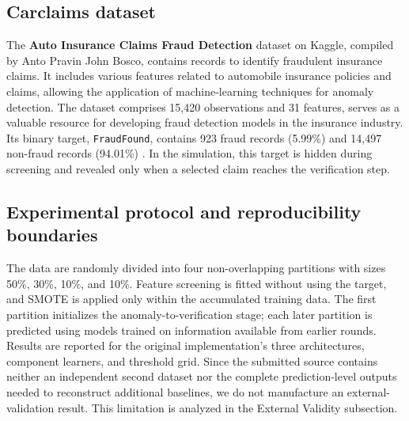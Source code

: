 \documentclass[12pt]{article}
\begin{document}
\subsection*{Carclaims dataset}
The \textbf{\small Auto Insurance Claims Fraud Detection} dataset
on Kaggle, compiled by Anto Pravin John Bosco, contains records to
identify fraudulent insurance claims. It includes various features
related to automobile insurance policies and claims, allowing the
application of machine-learning techniques for anomaly detection.
The dataset comprises 15,420 observations and 31 features,
serves as a valuable resource for developing fraud detection
models in the insurance industry. Its binary target, \texttt{FraudFound},
contains 923 fraud records (5.99\%) and 14,497 non-fraud records (94.01\%)
\cite{dataset}. In the simulation, this target is hidden during screening and
revealed only when a selected claim reaches the verification step.

\subsection*{Experimental protocol and reproducibility boundaries}
The data are randomly divided into four non-overlapping partitions with sizes
50\%, 30\%, 10\%, and 10\%. Feature screening is fitted without using the
target, and SMOTE is applied only within the accumulated training data. The
first partition initializes the anomaly-to-verification stage; each later
partition is predicted using models trained on information available from
earlier rounds. Results are reported for the original implementation's three
architectures, component learners, and threshold grid. Since the submitted
source contains neither an independent second dataset nor the complete
prediction-level outputs needed to reconstruct additional baselines, we do not
manufacture an external-validation result. This limitation is analyzed in the
External Validity subsection.
\end{document}
